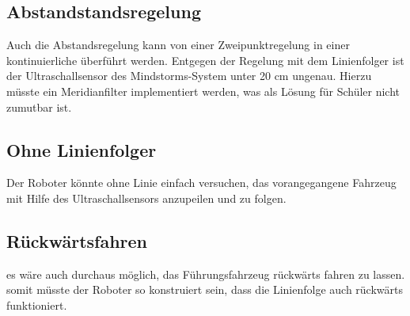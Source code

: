     \subsection{Abstandstandsregelung}
      Auch die Abstandsregelung kann von einer Zweipunktregelung in einer kontinuierliche überführt werden. Entgegen der Regelung mit dem Linienfolger ist der Ultraschallsensor des Mindstorms-System unter 20 cm ungenau. Hierzu müsste ein Meridianfilter implementiert werden, was als Lösung für Schüler nicht zumutbar ist.
    
    \subsection{Ohne Linienfolger}
      Der Roboter könnte ohne Linie einfach versuchen, das vorangegangene Fahrzeug mit Hilfe des Ultraschallsensors anzupeilen und zu folgen.
      
    \subsection{Rückwärtsfahren}
      es wäre auch durchaus möglich, das Führungsfahrzeug rückwärts fahren zu lassen. somit müsste der Roboter so konstruiert sein, dass die Linienfolge auch rückwärts funktioniert.
